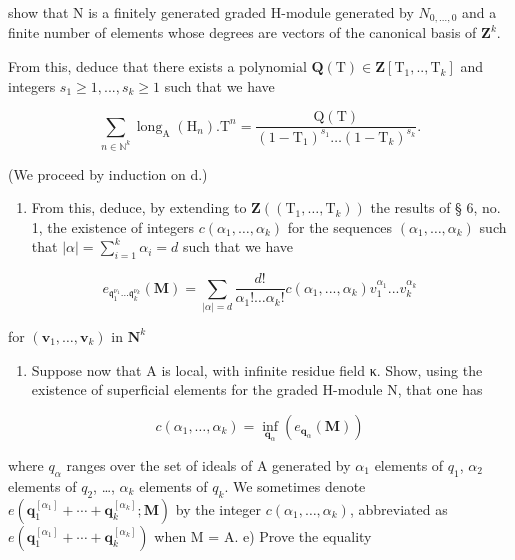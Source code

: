 show that N is a finitely generated graded H-module generated by \(N_{0,\ldots,0}\) and a finite number of elements whose degrees are vectors of the canonical basis of \(\mathbf{Z}^{k}\).

From this, deduce that there exists a polynomial \(\mathbf{Q}(\mathrm{T}) \in \mathbf{Z}[\mathrm{T}_1,..,\mathrm{T}_k]\) and integers \(s_1 \geqslant 1, ..., s_k \geqslant 1\) such that we have

\[
\sum_ {n \in \mathbb {N} ^ {k}} \operatorname{long} _ {\mathrm{A}} (\mathrm{H} _ {n}). \mathrm{T} ^ {n} = \frac {\mathrm{Q} (\mathrm{T})}{(1 - \mathrm{T} _ {1}) ^ {s _ {1}} \dots (1 - \mathrm{T} _ {k}) ^ {s _ {k}}}.
\]

(We proceed by induction on d.)

\begin{enumerate}
\def\labelenumi{\alph{enumi})}
\setcounter{enumi}{2}
\tightlist
\item
  From this, deduce, by extending to \(\mathbf{Z}((\mathrm{T}_{1},\ldots,\mathrm{T}_{k}))\) the results of § 6, no. 1, the existence of integers \(c(\alpha_{1},\ldots,\alpha_{k})\) for the sequences \((\alpha_{1},\ldots,\alpha_{k})\) such that \(|\alpha| = \sum_{i=1}^{k}\alpha_{i} = d\) such that we have
\end{enumerate}

\[
e _ {\mathfrak {q} _ {1} ^ {\nu_ {1}} \dots \mathfrak {q} _ {k} ^ {\nu_ {k}}} (\mathbf {M}) = \sum_ {| \alpha | = d} \frac {d !}{\alpha_ {1} ! \dots \alpha_ {k} !} c (\alpha_ {1},..., \alpha_ {k}) v _ {1} ^ {\alpha_ {1}}... v _ {k} ^ {\alpha_ {k}}
\]

for \((\mathbf{v}_1,\dots,\mathbf{v}_k)\) in \(\mathbf{N}^k\)

\begin{enumerate}
\def\labelenumi{\alph{enumi})}
\setcounter{enumi}{3}
\tightlist
\item
  Suppose now that A is local, with infinite residue field κ. Show, using the existence of superficial elements for the graded H-module N, that one has
\end{enumerate}

\[
c (\alpha_ {1}, \dots , \alpha_ {k}) = \inf _ {\mathbf {q} _ {\alpha}} (e _ {\mathbf {q} _ {\alpha}} (\mathbf {M}))
\]

where \(q_{\alpha}\) ranges over the set of ideals of A generated by \(\alpha_{1}\) elements of \(q_{1}\), \(\alpha_{2}\) elements of \(q_{2}\), \ldots, \(\alpha_{k}\) elements of \(q_{k}\). We sometimes denote \(e(\mathbf{q}_{1}^{[\alpha_{1}]} + \cdots + \mathbf{q}_{k}^{[\alpha_{k}]}; \mathbf{M})\) by the integer \(c(\alpha_{1}, \ldots, \alpha_{k})\), abbreviated as \(e(\mathbf{q}_{1}^{[\alpha_{1}]} + \cdots + \mathbf{q}_{k}^{[\alpha_{k}]})\) when M = A. e) Prove the equality

